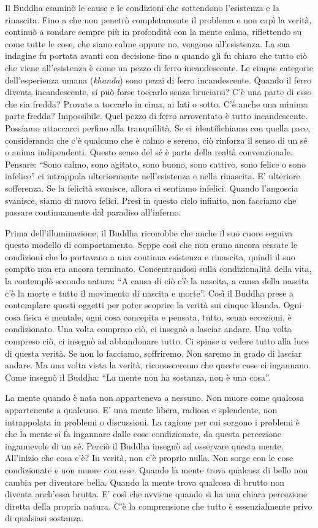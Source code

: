 Il Buddha esaminò le cause e le condizioni che sottendono l'esistenza e
la rinascita. Fino a che non penetrò completamente il problema e non
capì la verità, continuò a sondare sempre più in profondità con la mente
calma, riflettendo su come tutte le cose, che siano calme oppure no,
vengono all'esistenza. La sua indagine fu portata avanti con decisione
fino a quando gli fu chiaro che tutto ciò che viene all'esistenza è come
un pezzo di ferro incandescente. Le cinque categorie dell'esperienza
umana (\emph{khanda}) sono pezzi di ferro incandescente. Quando il ferro
diventa incandescente, si può forse toccarlo senza bruciarsi? C'è una
parte di esso che sia fredda? Provate a toccarlo in cima, ai lati o
sotto. C'è anche una minima parte fredda? Impossibile. Quel pezzo di
ferro arroventato è tutto incandescente. Possiamo attaccarci perfino
alla tranquillità. Se ci identifichiamo con quella pace, considerando
che c'è qualcuno che è calmo e sereno, ciò rinforza il senso di un sé o
anima indipendenti. Questo senso del sé è parte della realtà
convenzionale. Pensare: ``Sono calmo, sono agitato, sono buono, sono
cattivo, sono felice o sono infelice'' ci intrappola ulteriormente
nell'esistenza e nella rinascita. E' ulteriore sofferenza. Se la
felicità svanisce, allora ci sentiamo infelici. Quando l'angoscia
svanisce, siamo di nuovo felici. Presi in questo ciclo infinito, non
facciamo che passare continuamente dal paradiso all'inferno.

Prima dell'illuminazione, il Buddha riconobbe che anche il suo cuore
seguiva questo modello di comportamento. Seppe così che non erano ancora
cessate le condizioni che lo portavano a una continua esistenza e
rinascita, quindi il suo compito non era ancora terminato.
Concentrandosi sulla condizionalità della vita, la contemplò secondo
natura: ``A causa di ciò c'è la nascita, a causa della nascita c'è la
morte e tutto il movimento di nascita e morte''. Così il Buddha prese a
contemplare questi oggetti per poter scoprire la verità sui cinque
khanda. Ogni cosa fisica e mentale, ogni cosa concepita e pensata,
tutto, senza eccezioni, è condizionato. Una volta compreso ciò, ci
insegnò a lasciar andare. Una volta compreso ciò, ci insegnò ad
abbandonare tutto. Ci spinse a vedere tutto alla luce di questa verità.
Se non lo facciamo, soffriremo. Non saremo in grado di lasciar andare.
Ma una volta vista la verità, riconosceremo che queste cose ci
ingannano. Come insegnò il Buddha: ``La mente non ha sostanza, non è una
cosa''.

La mente quando è nata non apparteneva a nessuno. Non muore come
qualcosa appartenente a qualcuno. E' una mente libera, radiosa e
splendente, non intrappolata in problemi o discussioni. La ragione per
cui sorgono i problemi è che la mente si fa ingannare dalle cose
condizionate, da questa percezione ingannevole di un sé. Perciò il
Buddha insegnò ad osservare questa mente. All'inizio che cosa c'è? In
verità, non c'è proprio nulla. Non sorge con le cose condizionate e non
muore con esse. Quando la mente trova qualcosa di bello non cambia per
diventare bella. Quando la mente trova qualcosa di brutto non diventa
anch'essa brutta. E' così che avviene quando si ha una chiara percezione
diretta della propria natura. C'è la comprensione che tutto è
essenzialmente privo di qualsiasi sostanza.

